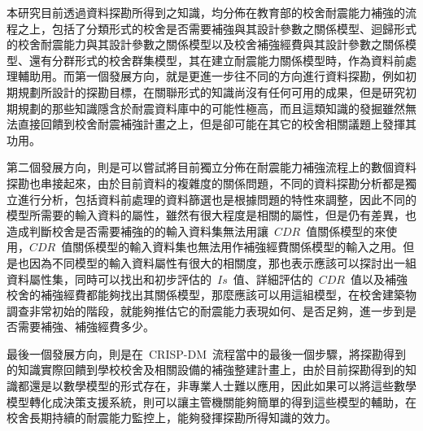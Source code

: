 本研究目前透過資料探勘所得到之知識，均分佈在教育部的校舍耐震能力補強的流程之上，包括了分類形式的校舍是否需要補強與其設計參數之關係模型、迴歸形式的校舍耐震能力與其設計參數之關係模型以及校舍補強經費與其設計參數之關係模型、還有分群形式的校舍群集模型，其在建立耐震能力關係模型時，作為資料前處理輔助用。而第一個發展方向，就是更進一步往不同的方向進行資料探勘，例如初期規劃所設計的探勘目標，在關聯形式的知識尚沒有任何可用的成果，但是研究初期規劃的那些知識隱含於耐震資料庫中的可能性極高，而且這類知識的發掘雖然無法直接回饋到校舍耐震補強計畫之上，但是卻可能在其它的校舍相關議題上發揮其功用。



第二個發展方向，則是可以嘗試將目前獨立分佈在耐震能力補強流程上的數個資料探勘也串接起來，由於目前資料的複雜度的關係問題，不同的資料探勘分析都是獨立進行分析，包括資料前處理的資料篩選也是根據問題的特性來調整，因此不同的模型所需要的輸入資料的屬性，雖然有很大程度是相關的屬性，但是仍有差異，也造成判斷校舍是否需要補強的的輸入資料集無法用讓~$CDR$~值關係模型的來使用，$CDR$~值關係模型的輸入資料集也無法用作補強經費關係模型的輸入之用。但是也因為不同模型的輸入資料屬性有很大的相關度，那也表示應該可以探討出一組資料屬性集，同時可以找出和初步評估的~$Is$~值、詳細評估的~$CDR$~值以及補強校舍的補強經費都能夠找出其關係模型，那麼應該可以用這組模型，在校舍建築物調查非常初始的階段，就能夠推估它的耐震能力表現如何、是否足夠，進一步到是否需要補強、補強經費多少。

最後一個發展方向，則是在~CRISP-DM~流程當中的最後一個步驟，將探勘得到的知識實際回饋到學校校舍及相關設備的補強整建計畫上，由於目前探勘得到的知識都還是以數學模型的形式存在，非專業人士難以應用，因此如果可以將這些數學模型轉化成決策支援系統，則可以讓主管機關能夠簡單的得到這些模型的輔助，在校舍長期持續的耐震能力監控上，能夠發揮探勘所得知識的效力。





